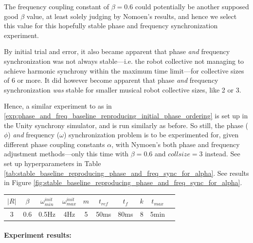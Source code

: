 			The frequency coupling constant of $\beta=0.6$ could potentially be another supposed good $\beta$ value, at least solely judging by Nomoen's results, and hence we select this value for this hopefully stable phase and frequency synchronization experiment.
			
			By initial trial and error, it also became apparent that phase \textit{and} frequency synchronization was not always stable—i.e. the robot collective not managing to achieve harmonic synchrony within the maximum time limit—for collective sizes of 6 or more. It did however become apparent that phase \textit{and} frequency synchronization \textit{was} stable for smaller musical robot collective sizes, like 2 or 3.
			
			Hence, a similar experiment to as in \ref{exp:phase_and_freq_baseline_reproducing_initial_phase_ordering} is set up in the Unity synchrony simulator, and is run similarly as before. So still, the phase ($\phi$) \textit{and} frequency ($\omega$) synchronization problem is to be experimented for, given different phase coupling constants $\alpha$, with Nymoen's both phase and frequency adjustment methods—only this time with $\beta=0.6$ and $collsize=3$ instead. See set up hyperparameters in Table \ref{tab:stable_baseline_reproducing_phase_and_freq_sync_for_alpha}. See results in Figure \ref{fig:stable_baseline_reproducing_phase_and_freq_sync_for_alpha}.
			
			\begin{center}
			\begin{tabular}{ |c|c|c|c|c|c|c|c|c|c| } 
			\hline
			$|R|$ & $\beta$ & $\omega_{min}^{init}$ & $\omega_{max}^{init}$ & $m$ & $t_{ref}$ & $t_f$ & $k$ & $t_{max}$ \\
			\hline
			3 & 0.6 & 0.5Hz & 4Hz & 5 & 50ms & 80ms & 8 & 5min \\
			\hline
			\end{tabular}
			\label{tab:stable_baseline_reproducing_phase_and_freq_sync_for_alpha}
			\end{center}
			
			\paragraph{Experiment results:\nl}
			
